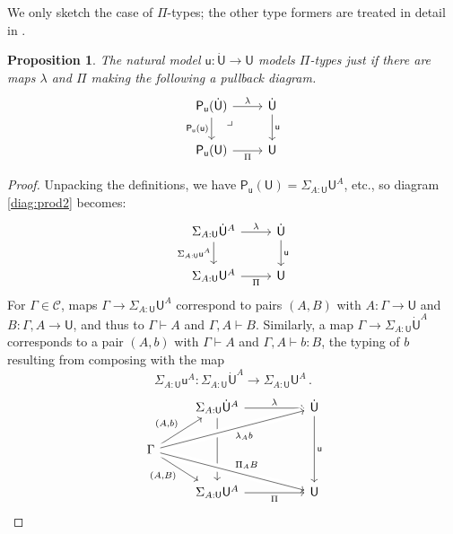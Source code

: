 \documentclass[12pt,reqno]{amsart}
\newcommand{\CC}{\ensuremath{\mathcal{C}}}
\newcommand{\alg}[1]{\ensuremath{\mathsf{#1}}}
\renewcommand{\to}{\ensuremath{\rightarrow}}
\newcommand{\G}{\ensuremath{\Gamma}}
\newcommand{\ext}[2]{{#1,#2}}
\renewcommand{\t}{\ensuremath{\mathsf{u}}}
\newcommand{\T}{\ensuremath{\mathsf{U}}}
\newcommand{\TT}{\ensuremath{\dot{\mathsf{U}}}}
\newcommand{\tT}{\ensuremath{{\t}:\TT\to\T}}
\newcommand{\pbcorner}{\arrow[dr,phantom,"\lrcorner" very near start, shift right=.5ex]} %
\newtheorem{proposition}[theorem]{Proposition}
\theoremstyle{remark}
\theoremstyle{definition}
\begin{document}
We only sketch the case of $\Pi$-types; the other type formers are treated in detail in \cite{awodey:NM, Newstead:thesis, NA:2018}.

\begin{proposition}  The natural model $\tT$ models $\Pi$-types just if there are maps $\lambda$ and $\Pi$ making the following a pullback diagram. 
\begin{equation}\label{diag:prod2}
\begin{tikzcd}
\alg{P}_\t(\TT)  \ar[d,swap, "{\alg{P}_\t(\t)}"]   \ar[r, "\lambda"]  \pbcorner &  \TT \ar[d, "{\t}"]\\
\alg{P}_\t(\T)	\ar[r,swap, "{\Pi}"] & \T
\end{tikzcd}
\end{equation}
\end{proposition}
%
\begin{proof}
Unpacking the definitions, we have $\alg{P}_\t(\T) = \Sigma_{A:\T} \T^A $, etc.,  
so diagram \eqref{diag:prod2} becomes:
\begin{equation*}%
\begin{tikzcd}
\Sigma_{A:\T} \TT^A \ar[d,swap, "{\Sigma_{A:\T} \t^A}"]  \ar[r, "{\lambda}"] &  \TT \ar[d,"{\t}"] \\
\Sigma_{A:\T} \T^A    \ar[r, swap,"{\Pi}"] & \T
\end{tikzcd}
\end{equation*}
For $\G \in \CC$, maps $\G\to \Sigma_{A:\T} \T^A $ correspond to pairs $(A,B)$ with  $A:\G\to \T$ and $B : \ext{\G}{A} \to \T$, and thus to $\G\vdash A$ and $\ext{\G}{A} \vdash B$. Similarly, a map $\G\to \Sigma_{A:\T} \TT^A $ corresponds to a pair $(A,b)$ with $\G\vdash A$ and $\ext{\G}{A} \vdash b : B$, the typing of $b$ resulting from composing with the map 
\[
\Sigma_{A:\T} \t^A : \Sigma_{A:\T} \TT^A \to \Sigma_{A:\T} \T^A\,.
\]
\begin{equation*}%
\begin{tikzcd}
	& \Sigma_{A:\T} \TT^A \ar[dd]  \ar[rr, "{\lambda}"] &&  \TT \ar[dd,"{\t}"] \\
\G \ar[dr,swap, "{(A,B)}"] \ar[ru, "{(A,b)}"] \ar[urrr, swap, crossing over, "{ \lambda_{A}b }"] \ar[drrr, crossing over, "{ \Pi_{A}B }"] &&& \\
 	& \Sigma_{A:\T}\T^A    \ar[rr, swap,"{\Pi}"] && \T 

\end{tikzcd}
\end{equation*}
\end{proof}
\end{document}
